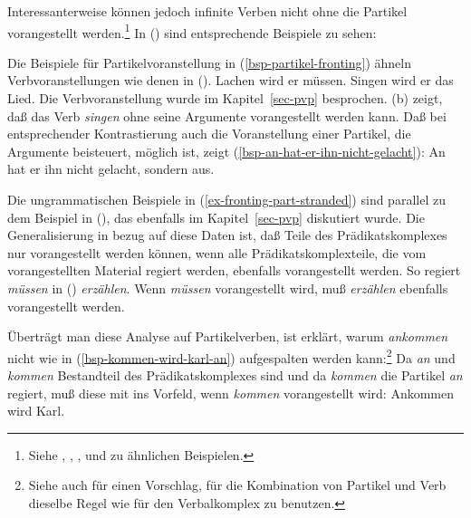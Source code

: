 Interessanterweise können jedoch infinite Verben nicht ohne die Partikel vorangestellt werden.\footnote{
        Siehe , , , %
         und  zu ähnlichen Beispielen.
}
In () sind entsprechende Beispiele zu sehen:
\eal
\label{ex-fronting-part-stranded}
\zl

\noindent
Die Beispiele für Partikelvoranstellung in (\ref{bsp-partikel-fronting}) ähneln Verbvoranstellungen wie denen in ().
\eal
\ex Lachen wird er müssen.
\ex Singen wird er das Lied.
\zl
Die Verbvoranstellung wurde im Kapitel~\ref{sec-pvp} besprochen. (b) zeigt,
daß das Verb \emph{singen} ohne seine Argumente vorangestellt werden kann.
Daß bei entsprechender Kontrastierung auch die Voranstellung einer Partikel,
die Argumente beisteuert, möglich ist, zeigt (\ref{bsp-an-hat-er-ihn-nicht-gelacht}):
\ea
\label{bsp-an-hat-er-ihn-nicht-gelacht}
An hat er ihn nicht gelacht, sondern aus.
\z

\noindent
Die ungrammatischen Beispiele in (\ref{ex-fronting-part-stranded}) sind
parallel zu dem Beispiel in (), das ebenfalls im Kapitel~\ref{sec-pvp}
diskutiert wurde.
\label{ex-muessen-wird-er-ihr-zwei}
\z
Die Generalisierung in bezug auf diese Daten ist, daß Teile des Prädikatskomplexes
nur vorangestellt werden können, wenn alle Prädikatskomplexteile, die vom vorangestellten
Material regiert werden, ebenfalls vorangestellt werden.
So regiert \zb \emph{müssen} in () \emph{erzählen}.
Wenn \emph{müssen} vorangestellt wird, muß \emph{erzählen} ebenfalls vorangestellt werden.

Überträgt man diese Analyse auf Partikelverben, ist erklärt, warum \zb \emph{ankommen}
nicht wie in (\ref{bsp-kommen-wird-karl-an}) aufgespalten werden kann:\footnote{
  Siehe auch  für einen Vorschlag, für die
  Kombination von Partikel und Verb dieselbe Regel wie für den Verbalkomplex zu benutzen.%
}
Da \emph{an} und \emph{kommen}
Bestandteil des Prädikatskomplexes sind und da \emph{kommen} die Partikel \emph{an} regiert,
muß diese mit ins Vorfeld, wenn \emph{kommen} vorangestellt wird:
\ea
Ankommen wird Karl.
\z
{}



